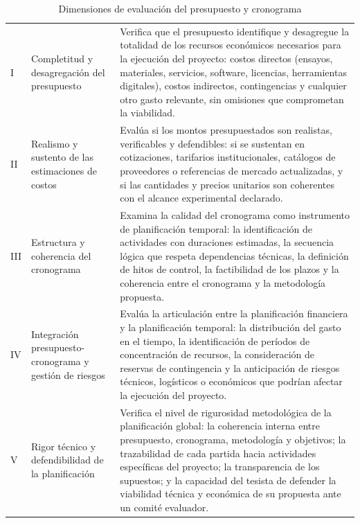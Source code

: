 \begin{table}[htbp]
\centering
\scriptsize
\caption{Dimensiones de evaluación del presupuesto y cronograma}
\label{tab:dim-presupuesto-cronograma}
\begin{tabularx}{\textwidth}{|C{0.6cm}|L{2.5cm}|X|}
\hline
{}
 &  &  \\ \hline
I & Completitud y desagregación del presupuesto & Verifica que el presupuesto identifique y desagregue la totalidad de los recursos económicos necesarios para la ejecución del proyecto: costos directos (ensayos, materiales, servicios, software, licencias, herramientas digitales), costos indirectos, contingencias y cualquier otro gasto relevante, sin omisiones que comprometan la viabilidad. \\ \hline
{}
II & Realismo y sustento de las estimaciones de costos & Evalúa si los montos presupuestados son realistas, verificables y defendibles: si se sustentan en cotizaciones, tarifarios institucionales, catálogos de proveedores o referencias de mercado actualizadas, y si las cantidades y precios unitarios son coherentes con el alcance experimental declarado. \\ \hline
III & Estructura y coherencia del cronograma & Examina la calidad del cronograma como instrumento de planificación temporal: la identificación de actividades con duraciones estimadas, la secuencia lógica que respeta dependencias técnicas, la definición de hitos de control, la factibilidad de los plazos y la coherencia entre el cronograma y la metodología propuesta. \\ \hline
{}
IV & Integración presupuesto-cronograma y gestión de riesgos & Evalúa la articulación entre la planificación financiera y la planificación temporal: la distribución del gasto en el tiempo, la identificación de períodos de concentración de recursos, la consideración de reservas de contingencia y la anticipación de riesgos técnicos, logísticos o económicos que podrían afectar la ejecución del proyecto. \\ \hline
V & Rigor técnico y defendibilidad de la planificación & Verifica el nivel de rigurosidad metodológica de la planificación global: la coherencia interna entre presupuesto, cronograma, metodología y objetivos; la trazabilidad de cada partida hacia actividades específicas del proyecto; la transparencia de los supuestos; y la capacidad del tesista de defender la viabilidad técnica y económica de su propuesta ante un comité evaluador. \\ \hline
\end{tabularx}
\end{table}

